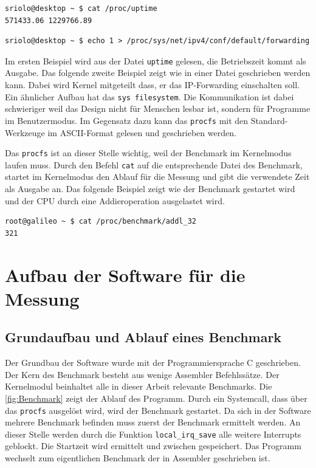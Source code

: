 \lstset{language=Bash}
\begin{lstlisting}
sriolo@desktop ~ $ cat /proc/uptime 
571433.06 1229766.89
\end{lstlisting}
\begin{lstlisting}
sriolo@desktop ~ $ echo 1 > /proc/sys/net/ipv4/conf/default/forwarding
\end{lstlisting}

Im ersten Beispiel wird aus der Datei \texttt{uptime} gelesen, die Betriebszeit kommt als Ausgabe. Das folgende zweite Beispiel zeigt wie in einer Datei geschrieben werden kann. Dabei wird Kernel mitgeteilt dass, er das IP-Forwarding einschalten soll. Ein ähnlicher Aufbau hat das \texttt{sys filesystem}. Die Kommunikation ist dabei schwieriger weil das Design nicht für Menschen lesbar ist, sondern für Programme im Benutzermodus. Im Gegensatz dazu kann das \texttt{procfs} mit den Standard-Werkzeuge im ASCII-Format gelesen und geschrieben werden.
\par
Das \texttt{procfs} ist an dieser Stelle wichtig, weil der Benchmark im Kernelmodus laufen muss. Durch den Befehl \texttt{cat} auf die entsprechende Datei des Benchmark, startet im Kernelmodus den Ablauf für die Messung und gibt die verwendete Zeit als Ausgabe an. Das folgende Beispiel zeigt wie der Benchmark gestartet wird und der CPU durch eine Addieroperation ausgelastet wird.

\begin{lstlisting}
root@galileo ~ $ cat /proc/benchmark/addl_32
321
\end{lstlisting}


\section{Aufbau der Software für die Messung}


\subsection{Grundaufbau und Ablauf eines Benchmark}
Der Grundbau der Software wurde mit der Programmiersprache C geschrieben. Der Kern des Benchmark besteht aus wenige Assembler Befehlssätze. Der Kernelmodul beinhaltet alle in dieser Arbeit relevante Benchmarks. Die \autoref{fig:Benchmark} zeigt der Ablauf des Programm. Durch ein Systemcall, dass über das \texttt{procfs} ausgelöst wird, wird der Benchmark gestartet. Da sich in der Software mehrere Benchmark befinden muss zuerst der Benchmark ermittelt werden. An dieser Stelle werden durch die Funktion \texttt{local\_irq\_save} alle weitere Interrupts geblockt. Die Startzeit wird ermittelt und zwischen gespeichert. Das Programm wechselt zum eigentlichen Benchmark der in Assembler geschrieben ist.


